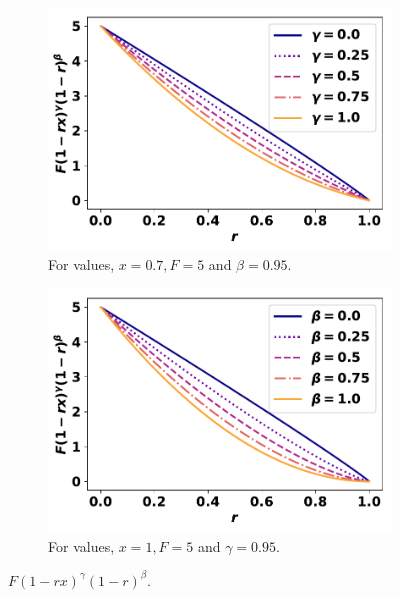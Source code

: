\documentclass[10pt]{article}
\begin{document}
\begin{figure}[!htbp]
\begin{center}
    \begin{subfigure}{0.40\textwidth}
        \includegraphics[width=\linewidth]{images/gammas_curve.pdf}
        \caption{For values, \(x=0.7, F=5\) and \(\beta=0.95\).}
    \end{subfigure}
    \begin{subfigure}{0.40\textwidth}
        \includegraphics[width=\linewidth]{images/betas_curve.pdf}
        \caption{For values, \(x=1, F=5\) and \(\gamma=0.95\).}
    \end{subfigure}
\caption{\(F (1 - rx)^{\gamma} (1 - r)^{\beta}\).}\label{fig:CostCurves}
\end{center}
\end{figure}
\end{document}
